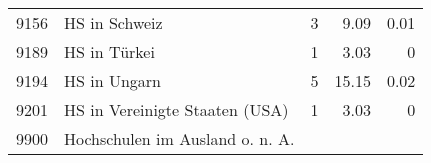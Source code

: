 \begin{longtable}{lXrrr}
     9156 &
     \multicolumn{1}{X}{ HS in Schweiz   } &


       \num{3} &
       \num[round-mode=places,round-precision=2]{9.09} &
         \num[round-mode=places,round-precision=2]{0.01} \\

     9189 &
     \multicolumn{1}{X}{ HS in Türkei   } &


       \num{1} &
       \num[round-mode=places,round-precision=2]{3.03} &
         \num[round-mode=places,round-precision=2]{0} \\

     9194 &
     \multicolumn{1}{X}{ HS in Ungarn   } &


       \num{5} &
       \num[round-mode=places,round-precision=2]{15.15} &
         \num[round-mode=places,round-precision=2]{0.02} \\

     9201 &
     \multicolumn{1}{X}{ HS in Vereinigte Staaten (USA)   } &


       \num{1} &
       \num[round-mode=places,round-precision=2]{3.03} &
         \num[round-mode=places,round-precision=2]{0} \\

     9900 &
     \multicolumn{1}{X}{ Hochschulen im Ausland o. n. A.   } &



\end{longtable}
